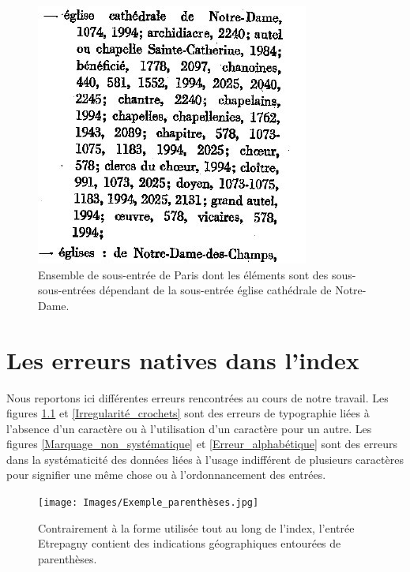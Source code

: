 \documentclass[a4paper,12pt,twoside]{book}
\begin{document}
	\begin{figure}
		\centering
		\includegraphics[width=\textwidth]{Images/Paris_sous_entrees_2.jpg}
		\caption{Ensemble de sous-entrée de \og Paris\fg{} dont les éléments sont des sous-sous-entrées dépendant de la sous-entrée \og église cathédrale de Notre-Dame\fg{}.}
		\label{Paris_sous_entrée_2}
	\end{figure}
	
	\chapter{Les erreurs natives dans l'index}
	
	Nous reportons ici différentes erreurs rencontrées au cours de notre travail. Les figures \ref{Parenthèses_pour_crochets} et \ref{Irregularité_crochets} sont des erreurs de typographie liées à l'absence d'un caractère ou à l'utilisation d'un caractère pour un autre. Les figures \ref{Marquage_non_systématique} et \ref{Erreur_alphabétique} sont des erreurs dans la systématicité des données liées à l'usage indifférent de plusieurs caractères pour signifier une même chose ou à l'ordonnancement des entrées.
	
	\pagebreak
	
	\begin{figure}
		\centering
		\texttt{[image: Images/Exemple\_parenthèses.jpg]}
		\caption{Contrairement à la forme utilisée tout au long de l'index, l'entrée \og Etrepagny\fg{} contient des indications géographiques entourées de parenthèses.}
		\label{Parenthèses_pour_crochets}
	\end{figure}
	
\end{document}
